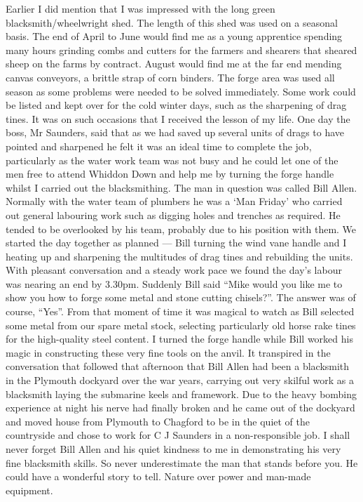 
Earlier I did mention that I was impressed with the long green
blacksmith/wheelwright shed. The length of this shed was used on a seasonal
basis. The end of April to June would find me as a young apprentice spending
many hours grinding combs and cutters for the farmers and shearers that sheared
sheep on the farms by contract. August would find me at the far end mending
canvas conveyors, a brittle strap of corn binders. The forge area was used all
season as some problems were needed to be solved immediately. Some work could
be listed and kept over for the cold winter days, such as the sharpening of
drag tines. It was on such occasions that I received the lesson of my life. One
day the boss, Mr Saunders, said that as we had saved up several units of drags
to have pointed and sharpened he felt it was an ideal time to complete the job,
particularly as the water work team was not busy and he could let one of the
men free to attend Whiddon Down and help me by turning the forge handle whilst
I carried out the blacksmithing. The man in question was called Bill Allen.
Normally with the water team of plumbers he was a `Man Friday' who carried out
general labouring work such as digging holes and trenches as required. He
tended to be overlooked by his team, probably due to his position with them. We
started the day together as planned --- Bill turning the wind vane handle and I
heating up and sharpening the multitudes of drag tines and rebuilding the
units. With pleasant conversation and a steady work pace we found the day's
labour was nearing an end by 3.30pm. Suddenly Bill said ``Mike would you like
me to show you how to forge some metal and stone cutting chisels?''. The answer
was of course, ``Yes''. From that moment of time it was magical to watch as
Bill selected some metal from our spare metal stock, selecting particularly old
horse rake tines for the high-quality steel content. I turned the forge handle
while Bill worked his magic in constructing these very fine tools on the anvil.
It transpired in the conversation that followed that afternoon that Bill Allen
had been a blacksmith in the Plymouth dockyard over the war years, carrying out
very skilful work as a blacksmith laying the submarine keels and framework. Due
to the heavy bombing experience at night his nerve had finally broken and he
came out of the dockyard and moved house from Plymouth to Chagford to be in the
quiet of the countryside and chose to work for C J  Saunders in a
non-responsible job. I shall never forget Bill Allen and his quiet kindness to
me in demonstrating his very fine blacksmith skills. So never underestimate the
man that stands before you. He could have a wonderful story to tell. Nature
over power and man-made equipment.

